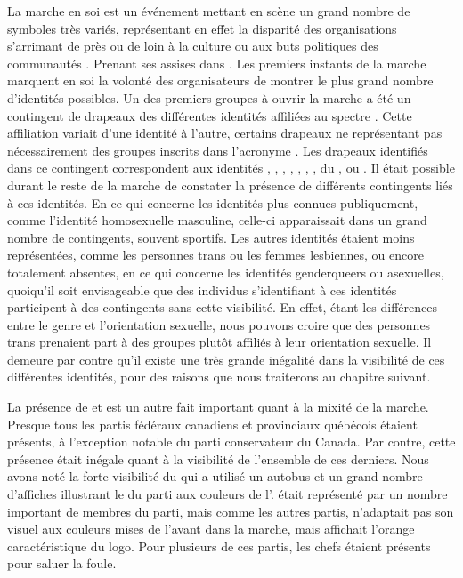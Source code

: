 La marche en soi est un événement mettant en scène un grand nombre de symboles très variés, représentant en effet la disparité des organisations s'arrimant de près ou de loin à la culture ou aux buts politiques des communautés \lgbt.
Prenant ses assises dans .
Les premiers instants de la marche marquent en soi la volonté des organisateurs de montrer le plus grand nombre d'identités possibles.
Un des premiers groupes à ouvrir la marche a été un contingent de drapeaux des différentes identités affiliées au spectre \lgbt{}.
Cette affiliation variait d'une identité à l'autre, certains drapeaux ne représentant pas nécessairement des groupes inscrits dans l'acronyme \lgbt.
Les drapeaux identifiés dans ce contingent correspondent aux identités , , , , , , , du , ou .
Il était possible durant le reste de la marche de constater la présence de différents contingents liés à ces identités.
En ce qui concerne les identités plus connues publiquement, comme l'identité homosexuelle masculine, celle-ci apparaissait dans un grand nombre de contingents, souvent sportifs.
Les autres identités étaient moins représentées, comme les personnes trans ou les femmes lesbiennes, ou encore totalement absentes, en ce qui concerne les identités genderqueers ou asexuelles, quoiqu'il soit envisageable que des individus s'identifiant à ces identités participent à des contingents sans cette visibilité.
En effet, étant les différences entre le genre et l'orientation sexuelle, nous pouvons croire que des personnes trans prenaient part à des groupes plutôt affiliés à leur orientation sexuelle.
Il demeure par contre qu'il existe une très grande inégalité dans la visibilité de ces différentes identités, pour des raisons que nous traiterons au chapitre suivant.

La présence de  et  est un autre fait important quant à la mixité de la marche.
Presque tous les partis fédéraux canadiens et provinciaux québécois étaient présents, à l'exception notable du parti conservateur du Canada.
Par contre, cette présence était inégale quant à la visibilité de l'ensemble de ces derniers.
Nous avons noté la forte visibilité du  qui a utilisé un autobus et un grand nombre d'affiches illustrant le  du parti aux couleurs de l'.
 était représenté par un nombre important de membres du parti, mais comme les autres partis, n'adaptait pas son visuel aux couleurs mises de l'avant dans la marche, mais affichait l'orange caractéristique du logo.
Pour plusieurs de ces partis, les chefs étaient présents pour saluer la foule.

